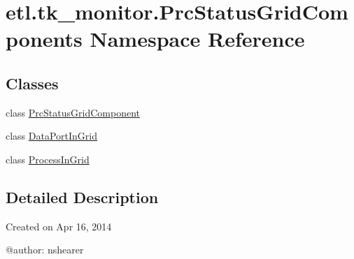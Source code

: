 \hypertarget{namespaceetl_1_1tk__monitor_1_1PrcStatusGridComponents}{\section{etl.\-tk\-\_\-monitor.\-Prc\-Status\-Grid\-Components Namespace Reference}
\label{namespaceetl_1_1tk__monitor_1_1PrcStatusGridComponents}
}
\subsection*{Classes}
\begin{DoxyCompactItemize}
\item 
class \hyperlink{classetl_1_1tk__monitor_1_1PrcStatusGridComponents_1_1PrcStatusGridComponent}{Prc\-Status\-Grid\-Component}
\item 
class \hyperlink{classetl_1_1tk__monitor_1_1PrcStatusGridComponents_1_1DataPortInGrid}{Data\-Port\-In\-Grid}
\item 
class \hyperlink{classetl_1_1tk__monitor_1_1PrcStatusGridComponents_1_1ProcessInGrid}{Process\-In\-Grid}
\end{DoxyCompactItemize}


\subsection{Detailed Description}
\begin{DoxyVerb}Created on Apr 16, 2014

@author: nshearer
\end{DoxyVerb}
 